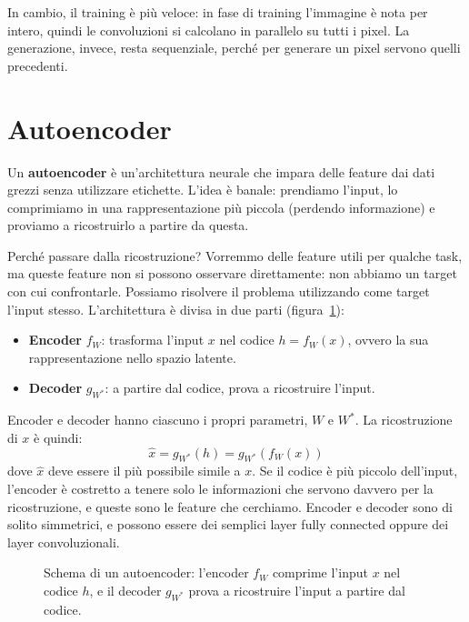 In cambio, il training è più veloce: in fase di training l'immagine è nota per intero, quindi le convoluzioni si calcolano in parallelo su tutti i pixel. La generazione, invece, resta sequenziale, perché per generare un pixel servono quelli precedenti.

\section{Autoencoder}\label{sec:autoencoder}
Un \textbf{autoencoder} è un'architettura neurale che impara delle feature dai dati grezzi senza utilizzare etichette. L'idea è banale: prendiamo l'input, lo comprimiamo in una rappresentazione più piccola (perdendo informazione) e proviamo a ricostruirlo a partire da questa.

Perché passare dalla ricostruzione? Vorremmo delle feature utili per qualche task, ma queste feature non si possono osservare direttamente: non abbiamo un target con cui confrontarle. Possiamo risolvere il problema utilizzando come target l'input stesso. L'architettura è divisa in due parti (figura~\ref{fig:autoencoder-schema}):
\begin{itemize}
    \item \textbf{Encoder} $f_W$: trasforma l'input $x$ nel codice $h = f_W(x)$, ovvero la sua rappresentazione nello spazio latente.
    \item \textbf{Decoder} $g_{W^*}$: a partire dal codice, prova a ricostruire l'input.
\end{itemize}

Encoder e decoder hanno ciascuno i propri parametri, $W$ e $W^*$. La ricostruzione di $x$ è quindi:
\[
    \hat{x} = g_{W^*}(h) = g_{W^*}(f_W(x))
\]
dove $\hat{x}$ deve essere il più possibile simile a $x$. Se il codice è più piccolo dell'input, l'encoder è costretto a tenere solo le informazioni che servono davvero per la ricostruzione, e queste sono le feature che cerchiamo. Encoder e decoder sono di solito simmetrici, e possono essere dei semplici layer fully connected oppure dei layer convoluzionali.

\begin{figure}[htbp]
\centering
{}
\caption{Schema di un autoencoder: l'encoder $f_W$ comprime l'input $x$ nel codice $h$, e il decoder $g_{W^*}$ prova a ricostruire l'input a partire dal codice.}
\label{fig:autoencoder-schema}
\end{figure}

